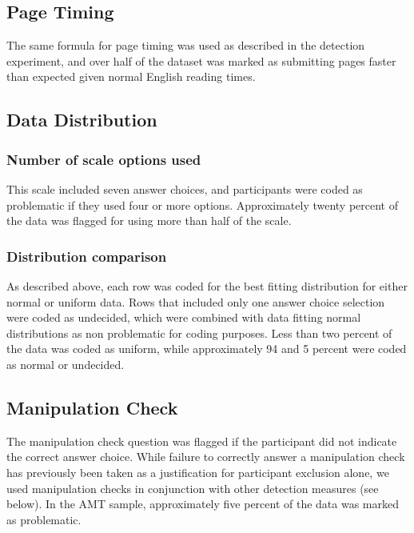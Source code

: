 \documentclass[english,man]{apa6}
\theoremstyle{definition}
\theoremstyle{definition}
\theoremstyle{definition}
\theoremstyle{remark}
\begin{document}
\subsection{Page Timing}\label{page-timing-2}

The same formula for page timing was used as described in the detection
experiment, and over half of the dataset was marked as submitting pages
faster than expected given normal English reading times.

\subsection{Data Distribution}\label{data-distribution-2}

\subsubsection{Number of scale options
used}\label{number-of-scale-options-used}

This scale included seven answer choices, and participants were coded as
problematic if they used four or more options. Approximately twenty
percent of the data was flagged for using more than half of the scale.

\subsubsection{Distribution comparison}\label{distribution-comparison-1}

As described above, each row was coded for the best fitting distribution
for either normal or uniform data. Rows that included only one answer
choice selection were coded as undecided, which were combined with data
fitting normal distributions as non problematic for coding purposes.
Less than two percent of the data was coded as uniform, while
approximately 94 and 5 percent were coded as normal or undecided.

\subsection{Manipulation Check}\label{manipulation-check}

The manipulation check question was flagged if the participant did not
indicate the correct answer choice. While failure to correctly answer a
manipulation check has previously been taken as a justification for
participant exclusion alone, we used manipulation checks in conjunction
with other detection measures (see below). In the AMT sample,
approximately five percent of the data was marked as problematic.
\end{document}

